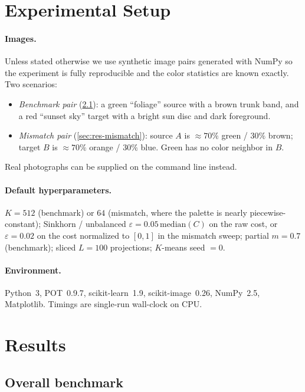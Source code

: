 \documentclass[11pt,a4paper]{article}
\begin{document}
\section{Experimental Setup}
\label{sec:setup}

\paragraph{Images.} Unless stated otherwise we use synthetic image pairs
generated with NumPy so the experiment is fully reproducible and the color
statistics are known exactly. Two scenarios:
\begin{itemize}
  \item \emph{Benchmark pair} (\cref{sec:res-bench}): a green ``foliage'' source
        with a brown trunk band, and a red ``sunset sky'' target with a bright
        sun disc and dark foreground.
  \item \emph{Mismatch pair} (\cref{sec:res-mismatch}): source $A$ is
        $\approx 70\%$ green / $30\%$ brown; target $B$ is $\approx 70\%$
        orange / $30\%$ blue. Green has no color neighbor in $B$.
\end{itemize}
Real photographs can be supplied on the command line instead.

\paragraph{Default hyperparameters.} $K = 512$ (benchmark) or $64$ (mismatch,
where the palette is nearly piecewise-constant); Sinkhorn / unbalanced
$\varepsilon = 0.05\,\mathrm{median}(C)$ on the raw cost, or $\varepsilon = 0.02$
on the cost normalized to $[0,1]$ in the mismatch sweep; partial $m = 0.7$
(benchmark); sliced $L = 100$ projections; $K$-means seed $= 0$.

\paragraph{Environment.} Python~3, POT~0.9.7, scikit-learn~1.9, scikit-image~0.26,
NumPy~2.5, Matplotlib. Timings are single-run wall-clock on CPU.

\section{Results}
\label{sec:results}

\subsection{Overall benchmark}
\label{sec:res-bench}
\end{document}
